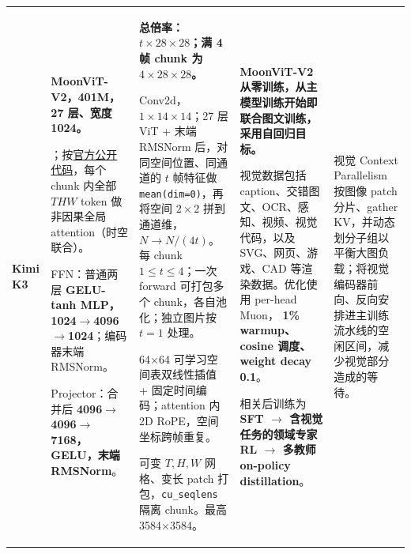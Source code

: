 \begin{longtable}{@{}P{0.130\dimexpr\textwidth-40pt\relax}P{0.235\dimexpr\textwidth-40pt\relax}P{0.300\dimexpr\textwidth-40pt\relax}P{0.245\dimexpr\textwidth-40pt\relax}P{0.090\dimexpr\textwidth-40pt\relax}@{}}
{\bfseries Kimi K3} & {\bfseries MoonViT-\allowbreak{}V2，401M，27 层、宽度 1024。}\par{}；按\href{\detokenize{https://huggingface.co/moonshotai/Kimi-K3/blob/f831ab66814297da540d832a5235f8e904f29d06/modeling_kimi_k3.py#L603-L615}}{官方公开代码}，每个 chunk 内全部 \(T H W\) token 做非因果全局 attention（时空联合）。\par\vspace{1pt}FFN：普通两层 {\bfseries GELU-\allowbreak{}tanh MLP，1024\(\rightarrow\)4096\(\rightarrow\)1024}；编码器末端 RMSNorm。\par\vspace{1pt}Projector：合并后 {\bfseries 4096\(\rightarrow\)4096\(\rightarrow\)7168，GELU，末端 RMSNorm}。 & {\bfseries 总倍率：\(t\times 28\times 28\)；满 4 帧 chunk 为 \(4\times 28\times 28\)。}\par{}Conv2d，\(1\times 14\times 14\)；27 层 ViT + 末端 RMSNorm 后，对同空间位置、同通道的 \(t\) 帧特征做 \texttt{mean(dim=\allowbreak{}0)}，再将空间 \(2\times 2\) 拼到通道维，{\bfseries \(N\rightarrow N/(4t)\)}。每 chunk \(1\leq t\leq 4\)；一次 forward 可打包多个 chunk，各自池化；独立图片按 \(t=1\) 处理。\par\vspace{1pt}{\bfseries 位置：}64\(\times\)64 可学习空间表双线性插值 + 固定时间编码；attention 内 2D RoPE，空间坐标跨帧重复。\par\vspace{1pt}{\bfseries 动态分辨率：是。} 可变 \(T,H,W\) 网格、变长 patch 打包，\texttt{cu\_\allowbreak{}seqlens} 隔离 chunk。最高 3584\(\times\)3584。 & {\bfseries MoonViT-\allowbreak{}V2 从零训练，从主模型训练开始即联合图文训练，采用自回归目标。}\par\vspace{1pt}视觉数据包括 caption、交错图文、OCR、感知、视频、视觉代码，以及 SVG、网页、游戏、CAD 等渲染数据。优化使用 per-\allowbreak{}head Muon， {\bfseries 1\% warmup、cosine 调度、weight decay 0.\allowbreak{}1}。\par\vspace{1pt}相关后训练为 {\bfseries SFT \(\rightarrow\) 含视觉任务的领域专家 RL \(\rightarrow\) 多教师 on-\allowbreak{}policy distillation}。 & 视觉 Context Parallelism 按图像 patch 分片、gather KV，并动态划分子组以平衡大图负载；将视觉编码器前向、反向安排进主训练流水线的空闲区间，减少视觉部分造成的等待。 \\

\end{longtable}
